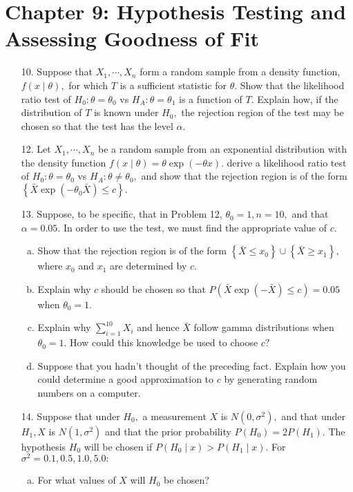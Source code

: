 \documentclass{article}
\begin{document}
\section*{Chapter 9: Hypothesis Testing and Assessing Goodness of Fit}

\begin{itemize}
	\item[10.] Suppose that $X_1, \cdots, X_n$ form a random sample from a density function, $f(x\mid \theta),$ for which $T$ is a sufficient statistic for $\theta.$ Show that the likelihood ratio test of $H_0:\theta=\theta_0$ vs $H_A:\theta=\theta_1$ is a function of $T.$ Explain how, if the distribution of $T$ is known under $H_0,$ the rejection region of the test may be chosen so that the test has the level $\alpha.$

	\item[12.] Let $X_1, \cdots, X_n$ be a random sample from an exponential distribution with the density function $f(x\mid \theta)=\theta\exp(-\theta x).$ derive a likelihood ratio test of $H_0:\theta=\theta_0$ vs $H_A:\theta\neq \theta_0,$ and show that the rejection region is of the form $\left\{ \bar{X}\exp(-\theta_0 \bar{X})\le c \right\}.$

	\item[13.] Suppose, to be specific, that in Problem 12, $\theta_0=1, n=10,$ and that $\alpha=0.05.$ In order to use the test, we must find the appropriate value of $c.$
		\begin{enumerate}[a.]
			\item Show that the rejection region is of the form $\left\{ \bar{X}\le x_0 \right\}\cup \left\{ \bar{X}\ge x_1 \right\},$ where $x_0$ and $x_1$ are determined by $c.$

			\item Explain why $c$ should be chosen so that $P(\bar{X}\exp(-\bar{X})\le c)=0.05$ when $\theta_0=1.$

			\item Explain why $\displaystyle \sum_{i=1}^{10} X_i$ and hence $\bar{X}$ follow gamma distributions when $\theta_0=1.$ How could this knowledge be used to choose $c?$

			\item Suppose that you hadn't thought of the preceding fact. Explain how you could determine a good approximation to $c$ by generating random numbers on a computer.
				
		\end{enumerate}

	\item[14.] Suppose that under $H_0,$ a measurement $X$ is $N(0, \sigma^2),$ and that under $H_1, X$ is $N(1, \sigma^2)$ and that the prior probability $P(H_0)=2P(H_1).$ The hypothesis $H_0$ will be chosen if $P(H_0\mid x)>P(H_1\mid x).$ For $\sigma^2=0.1, 0.5, 1.0, 5.0:$
		\begin{enumerate}[a.]
			\item For what values of $X$ will $H_0$ be chosen?


\end{enumerate}
\end{itemize}
\end{document}
